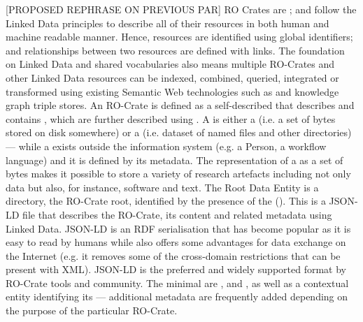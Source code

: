 {{}[PROPOSED REPHRASE ON PREVIOUS PAR] RO Crates are ; and follow the Linked Data principles to describe all of their resources in both human and machine readable manner. Hence, resources are identified using global identifiers; and relationships between two resources are defined with links.\markdownRendererInterblockSeparator
{}The foundation on Linked Data and shared vocabularies also means multiple RO-Crates and other Linked Data resources can be indexed, combined, queried, integrated or transformed using existing Semantic Web technologies such as  and knowledge graph triple stores.\markdownRendererInterblockSeparator
{}\markdownRendererInterblockSeparator
{}An RO-Crate is defined as a self-described  that describes and contains , which are further described using . A  is either a  (i.e. a set of bytes stored on disk somewhere) or a  (i.e. dataset of named files and other directories) — while a  exists outside the information system (e.g. a Person, a workflow language) and it is defined by its metadata. The representation of a  as a set of bytes makes it possible to store a variety of research artefacts including not only data but also, for instance, software and text.\markdownRendererInterblockSeparator
{}The Root Data Entity is a directory, the RO-Crate root, identified by the presence of the  (). This is a JSON-LD file that describes the RO-Crate, its content and related metadata using Linked Data. JSON-LD is an RDF serialisation that has become popular as it is easy to read by humans while also offers some advantages for data exchange on the Internet (e.g. it removes some of the cross-domain restrictions that can be present with XML). JSON-LD is the preferred and widely supported format by RO-Crate tools and community.\markdownRendererInterblockSeparator
{}The minimal  are ,  and , as well as a contextual entity identifying its  — additional metadata are frequently added depending on the purpose of the particular RO-Crate.\markdownRendererInterblockSeparator
}
